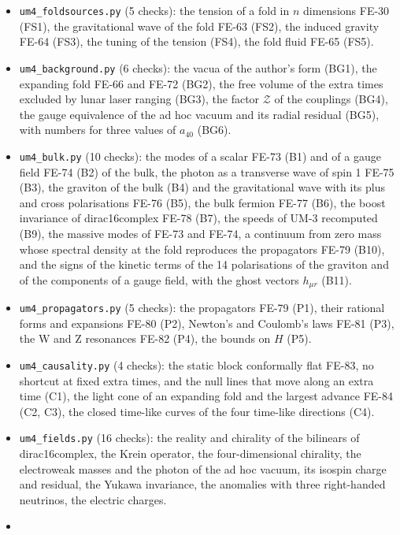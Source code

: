 \documentclass[
  10pt,
]{article}
\begin{document}
\begin{itemize}
  of the corrections (F5), the Weyl term that dust requires (F6).
\item
  \texttt{um4\_foldsources.py} (5 checks): the tension of a fold in
  \(n\) dimensions FE-30 (FS1), the gravitational wave of the fold FE-63
  (FS2), the induced gravity FE-64 (FS3), the tuning of the tension
  (FS4), the fold fluid FE-65 (FS5).
\item
  \texttt{um4\_background.py} (6 checks): the vacua of the author's form
  (BG1), the expanding fold FE-66 and FE-72 (BG2), the free volume of
  the extra times excluded by lunar laser ranging (BG3), the factor
  \(\mathcal{Z}\) of the couplings (BG4), the gauge equivalence of the
  ad hoc vacuum and its radial residual (BG5), with numbers for three
  values of \(a_{40}\) (BG6).
\item
  \texttt{um4\_bulk.py} (10 checks): the modes of a scalar FE-73 (B1)
  and of a gauge field FE-74 (B2) of the bulk, the photon as a
  transverse wave of spin 1 FE-75 (B3), the graviton of the bulk (B4)
  and the gravitational wave with its plus and cross polarisations FE-76
  (B5), the bulk fermion FE-77 (B6), the boost invariance of
  dirac16complex FE-78 (B7), the speeds of UM-3 recomputed (B9), the
  massive modes of FE-73 and FE-74, a continuum from zero mass whose
  spectral density at the fold reproduces the propagators FE-79 (B10),
  and the signs of the kinetic terms of the 14 polarisations of the
  graviton and of the components of a gauge field, with the ghost
  vectors \(h_{\mu r}\) (B11).
\item
  \texttt{um4\_propagators.py} (5 checks): the propagators FE-79 (P1),
  their rational forms and expansions FE-80 (P2), Newton's and Coulomb's
  laws FE-81 (P3), the W and Z resonances FE-82 (P4), the bounds on
  \(H\) (P5).
\item
  \texttt{um4\_causality.py} (4 checks): the static block conformally
  flat FE-83, no shortcut at fixed extra times, and the null lines that
  move along an extra time (C1), the light cone of an expanding fold and
  the largest advance FE-84 (C2, C3), the closed time-like curves of the
  four time-like directions (C4).
\item
  \texttt{um4\_fields.py} (16 checks): the reality and chirality of the
  bilinears of dirac16complex, the Krein operator, the four-dimensional
  chirality, the electroweak masses and the photon of the ad hoc vacuum,
  its isospin charge and residual, the Yukawa invariance, the anomalies
  with three right-handed neutrinos, the electric charges.
\item

\end{itemize}
\end{document}

